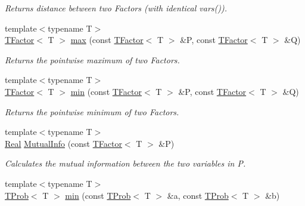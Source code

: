 \begin{CompactItemize}
\begin{CompactList}\small\item\em Returns distance between two Factors (with identical vars()). \item\end{CompactList}\item 
\hypertarget{namespacedai_26014cccb4cc16b53e83d350e280a705}{
{\footnotesize template$<$typename T$>$ }\\\hyperlink{classdai_1_1TFactor}{TFactor}$<$ T $>$ \hyperlink{namespacedai_26014cccb4cc16b53e83d350e280a705}{max} (const \hyperlink{classdai_1_1TFactor}{TFactor}$<$ T $>$ \&P, const \hyperlink{classdai_1_1TFactor}{TFactor}$<$ T $>$ \&Q)}
\label{namespacedai_26014cccb4cc16b53e83d350e280a705}

\begin{CompactList}\small\item\em Returns the pointwise maximum of two Factors. \item\end{CompactList}\item 
\hypertarget{namespacedai_0957f2d605d64a2e13b8dc3eb9fc8800}{
{\footnotesize template$<$typename T$>$ }\\\hyperlink{classdai_1_1TFactor}{TFactor}$<$ T $>$ \hyperlink{namespacedai_0957f2d605d64a2e13b8dc3eb9fc8800}{min} (const \hyperlink{classdai_1_1TFactor}{TFactor}$<$ T $>$ \&P, const \hyperlink{classdai_1_1TFactor}{TFactor}$<$ T $>$ \&Q)}
\label{namespacedai_0957f2d605d64a2e13b8dc3eb9fc8800}

\begin{CompactList}\small\item\em Returns the pointwise minimum of two Factors. \item\end{CompactList}\item 
\hypertarget{namespacedai_716237fb73c302a0ee0d3e334d71517c}{
{\footnotesize template$<$typename T$>$ }\\\hyperlink{namespacedai_e7d0472fdc89a8635825d01940e91cbf}{Real} \hyperlink{namespacedai_716237fb73c302a0ee0d3e334d71517c}{MutualInfo} (const \hyperlink{classdai_1_1TFactor}{TFactor}$<$ T $>$ \&P)}
\label{namespacedai_716237fb73c302a0ee0d3e334d71517c}

\begin{CompactList}\small\item\em Calculates the mutual information between the two variables in P. \item\end{CompactList}\item 
\hypertarget{namespacedai_db3928b138c1ec8f06433a84a670f56c}{
{\footnotesize template$<$typename T$>$ }\\\hyperlink{classdai_1_1TProb}{TProb}$<$ T $>$ \hyperlink{namespacedai_db3928b138c1ec8f06433a84a670f56c}{min} (const \hyperlink{classdai_1_1TProb}{TProb}$<$ T $>$ \&a, const \hyperlink{classdai_1_1TProb}{TProb}$<$ T $>$ \&b)}
\label{namespacedai_db3928b138c1ec8f06433a84a670f56c}


\end{CompactItemize}
